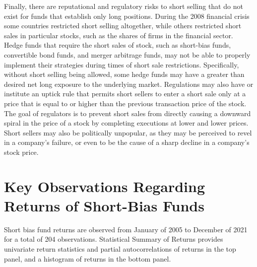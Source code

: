 \documentclass[11pt]{article}
\begin{document}
Finally, there are reputational and regulatory risks to short selling that do not exist for funds that establish only long positions. During the 2008 financial crisis some countries restricted short selling altogether, while others restricted short sales in particular stocks, such as the shares of firms in the financial sector. Hedge funds that require the short sales of stock, such as short-bias funds, convertible bond funds, and merger arbitrage funds, may not be able to properly implement their strategies during times of short sale restrictions. Specifically, without short selling being allowed, some hedge funds may have a greater than desired net long exposure to the underlying market. Regulations may also have or institute an uptick rule that permits short sellers to enter a short sale only at a price that is equal to or higher than the previous transaction price of the stock. The goal of regulators is to prevent short sales from directly causing a downward spiral in the price of a stock by completing executions at lower and lower prices. Short sellers may also be politically unpopular, as they may be perceived to revel in a company's failure, or even to be the cause of a sharp decline in a company's stock price.

\section*{Key Observations Regarding Returns of Short-Bias Funds}
Short bias fund returns are observed from January of 2005 to December of 2021 for a total of 204 observations. Statistical Summary of Returns provides univariate return statistics and partial autocorrelations of returns in the top panel, and a histogram of returns in the bottom panel.
\end{document}
